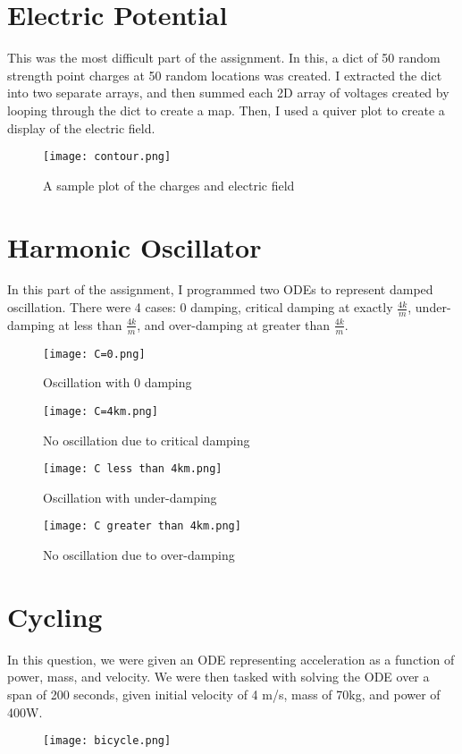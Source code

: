 \documentclass{article}
\begin{document}
\section{Electric Potential}
This was the most difficult part of the assignment. In this, a dict of 50 random strength point charges at 50 random locations was created. I extracted the dict into two separate arrays, and then summed each 2D array of voltages created by looping through the dict to create a map. Then, I used a quiver plot to create a display of the electric field.
\begin{figure}[h]
    \centering
    \texttt{[image: contour.png]}
    \caption{A sample plot of the charges and electric field}
    \label{fig:potential}
\end{figure}


\section{Harmonic Oscillator}
In this part of the assignment, I programmed two ODEs to represent damped oscillation. There were 4 cases: 0 damping, critical damping at exactly $\frac{4k}{m}$, under-damping at less than $\frac{4k}{m}$, and over-damping at greater than $\frac{4k}{m}$.\\
\begin{figure}[htp!]
    \centering
    \texttt{[image: C=0.png]}
    \caption{Oscillation with 0 damping}
    \label{fig:C=0}
\end{figure}

\begin{figure}[htp!]
    \centering
    \texttt{[image: C=4km.png]}
    \caption{No oscillation due to critical damping}
    \label{fig:C=critical}
\end{figure}
\begin{figure}[htp!]
    \centering
    \texttt{[image: C less than 4km.png]}
    \caption{Oscillation with under-damping}
    \label{fig:C<critical}
\end{figure}
\begin{figure}[htp!]
    \centering
    \texttt{[image: C greater than 4km.png]}
    \caption{No oscillation due to over-damping}
    \label{fig:C>critical}
\end{figure}

\section{Cycling}
In this question, we were given an ODE representing acceleration as a function of power, mass, and velocity. We were then tasked with solving the ODE over a span of 200 seconds, given initial velocity of 4 m/s, mass of 70kg, and power of 400W.
\begin{figure}[h!]
    \centering
    \texttt{[image: bicycle.png]}
    \label{fig:bicycle}
\end{figure}
\end{document}
